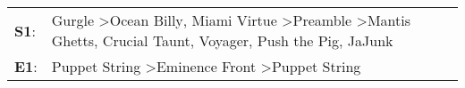 \begin{supertabular}{p{0.03\textwidth}p{0.92\textwidth}}
 \textbf{S1}:  &  Gurgle\textsuperscript{} \textgreater \enspace Ocean Billy\textsuperscript{}, \enspace Miami Virtue\textsuperscript{} \textgreater \enspace Preamble\textsuperscript{} \textgreater \enspace Mantis Ghetts\textsuperscript{}, \enspace Crucial Taunt\textsuperscript{}, \enspace Voyager\textsuperscript{}, \enspace Push the Pig\textsuperscript{}, \enspace JaJunk\textsuperscript{}  \enspace  \\
 \textbf{E1}:  &                                                                                                                                                                                                                                            Puppet String\textsuperscript{} \textgreater \enspace Eminence Front\textsuperscript{} \textgreater \enspace Puppet String\textsuperscript{}  \enspace  \\
\end{supertabular}
